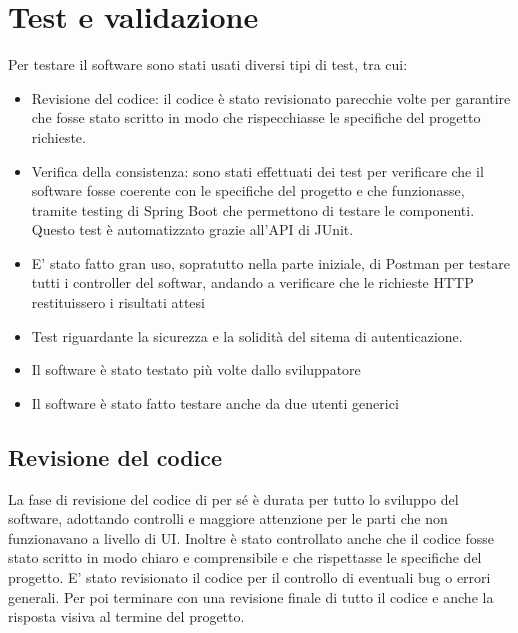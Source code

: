 \documentclass{article}
\begin{document}
\newpage
\section{Test e validazione}
Per testare il software sono stati usati diversi tipi di test, tra cui:
\begin{itemize}
   \item Revisione del codice: il codice è stato revisionato parecchie volte per garantire che fosse
       stato scritto in modo che rispecchiasse le specifiche del progetto richieste.
   \item Verifica della consistenza: sono stati effettuati dei test per verificare che il software fosse coerente con le specifiche
       del progetto e che funzionasse, tramite testing di Spring Boot che permettono di testare le componenti. Questo test è automatizzato
       grazie all'API di JUnit.
   \item E' stato fatto gran uso, sopratutto nella parte iniziale, di Postman per testare tutti i controller del softwar, andando a verificare che le richieste HTTP restituissero i risultati attesi
   \item Test riguardante la sicurezza e la solidità del sitema di autenticazione.
   \item Il software è stato testato più volte dallo sviluppatore
   \item Il software è stato fatto testare anche da due utenti generici
\end{itemize}
\subsection{Revisione del codice}
La fase di revisione del codice di per sé è durata per tutto lo sviluppo del software, adottando controlli e maggiore attenzione per le
parti che non funzionavano a livello di UI. Inoltre è stato controllato anche che il codice fosse stato scritto in modo chiaro e comprensibile e che rispettasse le specifiche del progetto.
E' stato revisionato il codice per il controllo di eventuali bug o errori generali. Per poi terminare con una revisione finale di tutto il codice e anche la risposta visiva al termine del progetto.
\end{document}
